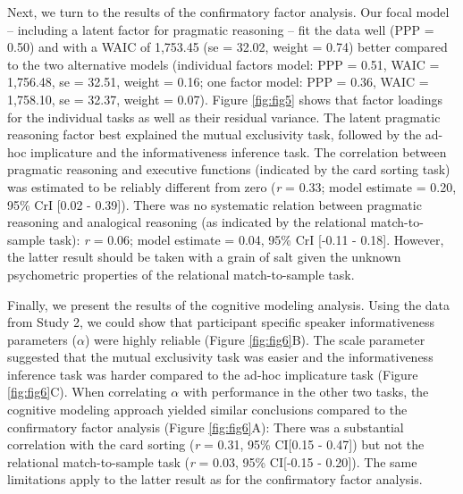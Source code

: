 \documentclass[
  english,
  man,floatsintext]{apa6}
\begin{document}
Next, we turn to the results of the confirmatory factor analysis. Our focal model -- including a latent factor for pragmatic reasoning -- fit the data well (PPP = 0.50) and with a WAIC of 1,753.45 (se = 32.02, weight = 0.74) better compared to the two alternative models (individual factors model: PPP = 0.51, WAIC = 1,756.48, se = 32.51, weight = 0.16; one factor model: PPP = 0.36, WAIC = 1,758.10, se = 32.37, weight = 0.07). Figure \ref{fig:fig5} shows that factor loadings for the individual tasks as well as their residual variance. The latent pragmatic reasoning factor best explained the mutual exclusivity task, followed by the ad-hoc implicature and the informativeness inference task. The correlation between pragmatic reasoning and executive functions (indicated by the card sorting task) was estimated to be reliably different from zero (\emph{r} = 0.33; model estimate = 0.20, 95\% CrI {[}0.02 - 0.39{]}). There was no systematic relation between pragmatic reasoning and analogical reasoning (as indicated by the relational match-to-sample task): \emph{r} = 0.06; model estimate = 0.04, 95\% CrI {[}-0.11 - 0.18{]}. However, the latter result should be taken with a grain of salt given the unknown psychometric properties of the relational match-to-sample task.

Finally, we present the results of the cognitive modeling analysis. Using the data from Study 2, we could show that participant specific speaker informativeness parameters (\(\alpha\)) were highly reliable (Figure \ref{fig:fig6}B). The scale parameter suggested that the mutual exclusivity task was easier and the informativeness inference task was harder compared to the ad-hoc implicature task (Figure \ref{fig:fig6}C). When correlating \(\alpha\) with performance in the other two tasks, the cognitive modeling approach yielded similar conclusions compared to the confirmatory factor analysis (Figure \ref{fig:fig6}A): There was a substantial correlation with the card sorting (\emph{r} = 0.31, 95\% CI{[}0.15 - 0.47{]}) but not the relational match-to-sample task (\emph{r} = 0.03, 95\% CI{[}-0.15 - 0.20{]}). The same limitations apply to the latter result as for the confirmatory factor analysis.
\end{document}
